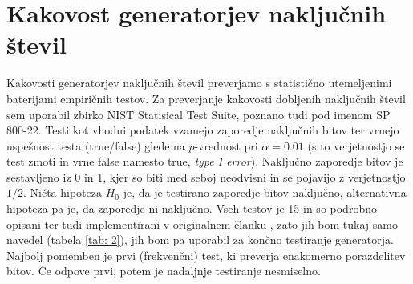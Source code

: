 \documentclass[11pt, oneside]{article}
\theoremstyle{definition}
\begin{document}
\newpage

\section{Kakovost generatorjev naključnih števil}
Kakovosti generatorjev naključnih števil preverjamo s statistično utemeljenimi baterijami empiričnih testov.
Za preverjanje kakovosti dobljenih naključnih števil sem uporabil zbirko NIST Statisical Test Suite,
poznano tudi pod imenom SP 800-22. Testi kot vhodni podatek vzamejo zaporedje naključnih
bitov ter vrnejo uspešnost testa (true/false) glede na $p$-vrednost pri $\alpha=0.01$ (s to verjetnostjo se test zmoti in vrne false namesto true, \emph{type I error}).
Naključno zaporedje bitov je sestavljeno iz 0 in 1, kjer so biti med seboj neodvisni in se pojavijo z verjetnostjo $1/2$.
Ničta hipoteza $H_0$ je, da je testirano zaporedje bitov naključno, alternativna hipoteza pa je, da zaporedje
ni naključno. Vseh testov je 15 in so podrobno opisani ter tudi implementirani v originalnem članku \cite{sp800-22},
zato jih bom tukaj samo navedel (tabela \ref{tab: 2}), jih bom pa uporabil za končno testiranje generatorja.
Najbolj pomemben je prvi (frekvenčni) test, ki preverja enakomerno porazdelitev bitov. Če odpove prvi, potem
je nadaljnje testiranje nesmiselno.
\end{document}
